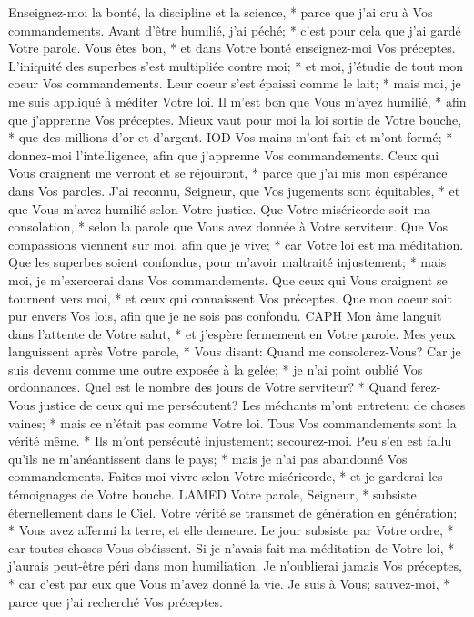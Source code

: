 Enseignez-moi la bonté, la discipline et la science, * parce que j'ai cru à Vos commandements.
Avant d'être humilié, j'ai péché; * c'est pour cela que j'ai gardé Votre parole.
Vous êtes bon, * et dans Votre bonté enseignez-moi Vos préceptes.
L'iniquité des superbes s'est multipliée contre moi; * et moi, j'étudie de tout mon coeur Vos commandements.
Leur coeur s'est épaissi comme le lait; * mais moi, je me suis appliqué à méditer Votre loi.
Il m'est bon que Vous m'ayez humilié, * afin que j'apprenne Vos préceptes.
Mieux vaut pour moi la loi sortie de Votre bouche, * que des millions d'or et d'argent.
IOD
Vos mains m'ont fait et m'ont formé; * donnez-moi l'intelligence, afin que j'apprenne Vos commandements.
Ceux qui Vous craignent me verront et se réjouiront, * parce que j'ai mis mon espérance dans Vos paroles.
J'ai reconnu, Seigneur, que Vos jugements sont équitables, * et que Vous m'avez humilié selon Votre justice.
Que Votre miséricorde soit ma consolation, * selon la parole que Vous avez donnée à Votre serviteur.
Que Vos compassions viennent sur moi, afin que je vive; * car Votre loi est ma méditation.
Que les superbes soient confondus, pour m'avoir maltraité injustement; * mais moi, je m'exercerai dans Vos commandements.
Que ceux qui Vous craignent se tournent vers moi, * et ceux qui connaissent Vos préceptes.
Que mon coeur soit pur envers Vos lois, afin que je ne sois pas confondu.
CAPH
Mon âme languit dans l'attente de Votre salut, * et j'espère fermement en Votre parole.
Mes yeux languissent après Votre parole, * Vous disant: Quand me consolerez-Vous?
Car je suis devenu comme une outre exposée à la gelée; * je n'ai point oublié Vos ordonnances.
Quel est le nombre des jours de Votre serviteur? * Quand ferez-Vous justice de ceux qui me persécutent?
Les méchants m'ont entretenu de choses vaines; * mais ce n'était pas comme Votre loi.
Tous Vos commandements sont la vérité même. * Ils m'ont persécuté injustement; secourez-moi.
Peu s'en est fallu qu'ils ne m'anéantissent dans le pays; * mais je n'ai pas abandonné Vos commandements.
Faites-moi vivre selon Votre miséricorde, * et je garderai les témoignages de Votre bouche.
LAMED
Votre parole, Seigneur, * subsiste éternellement dans le Ciel.
Votre vérité se transmet de génération en génération; * Vous avez affermi la terre, et elle demeure.
Le jour subsiste par Votre ordre, * car toutes choses Vous obéissent.
Si je n'avais fait ma méditation de Votre loi, * j'aurais peut-être péri dans mon humiliation.
Je n'oublierai jamais Vos préceptes, * car c'est par eux que Vous m'avez donné la vie.
Je suis à Vous; sauvez-moi, * parce que j'ai recherché Vos préceptes.
